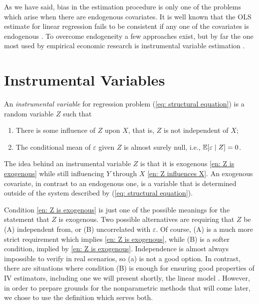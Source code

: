 As we have said, bias in the estimation procedure is only one of the problems which arise when there are endogenous covariates.
It is well known that the OLS estimate for linear regression fails to be consistent if any one of the covariates is endogenous \cite{wooldridge2001}.
To overcome endogeneity a few approaches exist, but by far the one most used by empirical economic research is instrumental variable estimation \cite{wooldridge2001}.

\section{Instrumental Variables}

\begin{deff}
    \label{def: iv}
    An \emph{instrumental variable} for regression problem (\ref{eq: structural equation}) is a random variable $ Z $ such that
    \begin{enumerate}
        \item There is some influence of $ Z $ upon $ X $, that is, $ Z $ is not independent of $ X $; \label{en: Z influences X}
        \item The conditional mean of $ \varepsilon $ given $ Z $ is almost surely null, i.e., $ \mathbb{E} [ \varepsilon \mid Z ] = 0 $. \label{en: Z is exogenous}
    \end{enumerate}
\end{deff}


The idea behind an instrumental variable $ Z $ is that it is exogenous \ref{en: Z is exogenous} while still influencing $ Y $ through $ X $ \ref{en: Z influences X}.
An exogenous covariate, in contrast to an endogenous one, is a variable that is determined outside of the system described by (\ref{eq: structural equation}).

Condition \ref{en: Z is exogenous} is just one of the possible meanings for the statement that $ Z $ is exogenous.
Two possible alternatives are requiring that $ Z $ be (A) independent from, or (B) uncorrelated with $ \varepsilon $.
Of course, (A) is a much more strict requirement which implies \ref{en: Z is exogenous}, while (B) is a softer condition, implied by \ref{en: Z is exogenous}.
Independence is almost always impossible to verify in real scenarios, so (a) is not a good option.
In contrast, there are situations where condition (B) is enough for ensuring good properties of IV estimators, including one we will present shortly, the linear model \cite{wooldridge2001}.
However, in order to prepare grounds for the nonparametric methods that will come later, we chose to use the definition which serves both.


